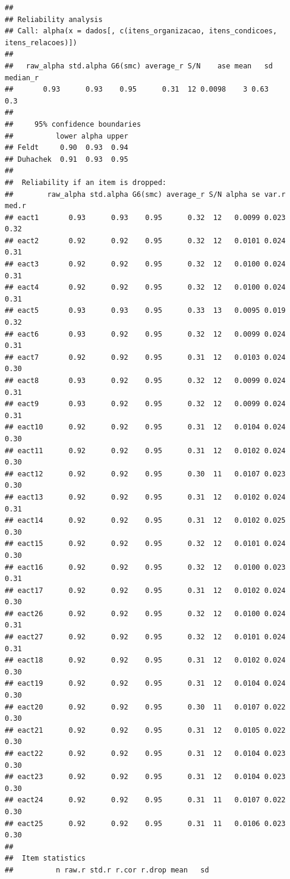 \documentclass[
]{article}
\begin{document}
\begin{verbatim}
## 
## Reliability analysis   
## Call: alpha(x = dados[, c(itens_organizacao, itens_condicoes, itens_relacoes)])
## 
##   raw_alpha std.alpha G6(smc) average_r S/N    ase mean   sd median_r
##       0.93      0.93    0.95      0.31  12 0.0098    3 0.63      0.3
## 
##     95% confidence boundaries 
##          lower alpha upper
## Feldt     0.90  0.93  0.94
## Duhachek  0.91  0.93  0.95
## 
##  Reliability if an item is dropped:
##        raw_alpha std.alpha G6(smc) average_r S/N alpha se var.r med.r
## eact1       0.93      0.93    0.95      0.32  12   0.0099 0.023  0.32
## eact2       0.92      0.92    0.95      0.32  12   0.0101 0.024  0.31
## eact3       0.92      0.92    0.95      0.32  12   0.0100 0.024  0.31
## eact4       0.92      0.92    0.95      0.32  12   0.0100 0.024  0.31
## eact5       0.93      0.93    0.95      0.33  13   0.0095 0.019  0.32
## eact6       0.93      0.92    0.95      0.32  12   0.0099 0.024  0.31
## eact7       0.92      0.92    0.95      0.31  12   0.0103 0.024  0.30
## eact8       0.93      0.92    0.95      0.32  12   0.0099 0.024  0.31
## eact9       0.93      0.92    0.95      0.32  12   0.0099 0.024  0.31
## eact10      0.92      0.92    0.95      0.31  12   0.0104 0.024  0.30
## eact11      0.92      0.92    0.95      0.31  12   0.0102 0.024  0.30
## eact12      0.92      0.92    0.95      0.30  11   0.0107 0.023  0.30
## eact13      0.92      0.92    0.95      0.31  12   0.0102 0.024  0.31
## eact14      0.92      0.92    0.95      0.31  12   0.0102 0.025  0.30
## eact15      0.92      0.92    0.95      0.32  12   0.0101 0.024  0.30
## eact16      0.92      0.92    0.95      0.32  12   0.0100 0.023  0.31
## eact17      0.92      0.92    0.95      0.31  12   0.0102 0.024  0.30
## eact26      0.92      0.92    0.95      0.32  12   0.0100 0.024  0.31
## eact27      0.92      0.92    0.95      0.32  12   0.0101 0.024  0.31
## eact18      0.92      0.92    0.95      0.31  12   0.0102 0.024  0.30
## eact19      0.92      0.92    0.95      0.31  12   0.0104 0.024  0.30
## eact20      0.92      0.92    0.95      0.30  11   0.0107 0.022  0.30
## eact21      0.92      0.92    0.95      0.31  12   0.0105 0.022  0.30
## eact22      0.92      0.92    0.95      0.31  12   0.0104 0.023  0.30
## eact23      0.92      0.92    0.95      0.31  12   0.0104 0.023  0.30
## eact24      0.92      0.92    0.95      0.31  11   0.0107 0.022  0.30
## eact25      0.92      0.92    0.95      0.31  11   0.0106 0.023  0.30
## 
##  Item statistics 
##          n raw.r std.r r.cor r.drop mean   sd

\end{verbatim}
\end{document}
